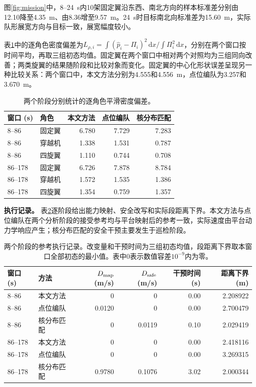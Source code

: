 \documentclass[UTF8,a4paper,11pt,fontset=none]{ctexart}
\begin{document}
图\ref{fig:mission}中，8--24~s内10架固定翼沿东西、南北方向的样本标准差分别由12.10降至4.35~m、由8.36增至9.57~m。24~s时目标南北向标准差为15.60~m，实际队形展宽方向与目标一致，展宽幅度较小。

表\ref{tab:role-density-stages}中的逐角色密度偏差为$L_{\rho,i}=\int(\widehat p_i-\Pi_i)^2\,\mathrm dx/\int\Pi_i^2\,\mathrm dx$，分别在两个窗口按时间平均，再取三组初态均值。固定翼在两个窗口中相对两个对照均为三组同向改善；两类旋翼的结果随阶段和比较对象而变化。固定翼的中心化形状误差呈现另一种比较关系：两个窗口中，本文方法分别为4.555和4.556~m，点位编队为3.257和3.670~m。

\begin{table}[htbp]\centering\small
\caption{两个阶段分别统计的逐角色平滑密度偏差。}\label{tab:role-density-stages}
\begin{tabular}{llrrr}\toprule
窗口 (s) & 角色 & 本文方法 & 点位编队 & 核分布匹配\\\midrule
8--86 & 固定翼 & 6.780 & 7.729 & 7.283\\
8--86 & 穿越机 & 1.338 & 1.531 & 0.787\\
8--86 & 四旋翼 & 1.110 & 0.744 & 0.708\\
\midrule
86--178 & 固定翼 & 6.726 & 7.878 & 8.784\\
86--178 & 穿越机 & 1.572 & 1.535 & 1.386\\
86--178 & 四旋翼 & 1.354 & 0.759 & 1.357\\
\bottomrule\end{tabular}\end{table}

\noindent\textbf{执行记录。}\label{app:execution-statistics}
表\ref{tab:phase-execution}逐阶段给出能力映射、安全改写和实际段距离下界。本文方法与点位编队在两个分析阶段的接受参考均与平台映射后的参考一致，实际速度由平台动力学响应产生；核分布匹配的安全干预主要发生于巡检阶段。

\begin{table}[htbp]\centering\small
\caption{两个阶段的参考执行记录。改变量和干预时间为三组初态均值，段距离下界取本窗口全部初态的最小值。表中0表示数值容差$10^{-9}$内为零。}\label{tab:phase-execution}
\setlength{\tabcolsep}{4pt}
\begin{tabular}{llrrrr}\toprule
窗口 (s) & 方法 & $D_{\rm map}$ (m/s) & $D_{\rm safe}$ (m/s) & 干预时间 (s) & 距离下界 (m)\\\midrule
8--86 & 本文方法 & 0 & 0 & 0.00 & 2.208922\\
8--86 & 点位编队 & 0.0120 & 0 & 0.00 & 2.700479\\
8--86 & 核分布匹配 & 0 & 0.0119 & 0.10 & 2.029419\\
\midrule
86--178 & 本文方法 & 0 & 0 & 0.00 & 2.418116\\
86--178 & 点位编队 & 0 & 0 & 0.00 & 3.269315\\
86--178 & 核分布匹配 & 0.9780 & 0.1076 & 3.02 & 2.000344\\
\bottomrule\end{tabular}\end{table}
\end{document}
